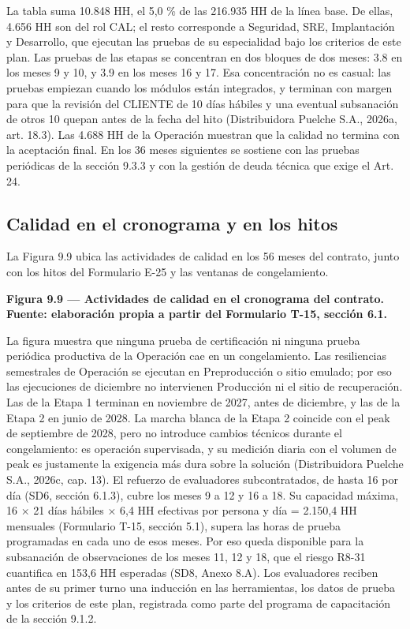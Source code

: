 La tabla suma 10.848 HH, el 5,0 \% de las 216.935 HH de la línea base. De ellas, 4.656 HH son del rol CAL; el resto corresponde a Seguridad, SRE, Implantación y Desarrollo, que ejecutan las pruebas de su especialidad bajo los criterios de este plan. Las pruebas de las etapas se concentran en dos bloques de dos meses: 3.8 en los meses 9 y 10, y 3.9 en los meses 16 y 17. Esa concentración no es casual: las pruebas empiezan cuando los módulos están integrados, y terminan con margen para que la revisión del CLIENTE de 10 días hábiles y una eventual subsanación de otros 10 quepan antes de la fecha del hito (Distribuidora Puelche S.A., 2026a, art. 18.3). Las 4.688 HH de la Operación muestran que la calidad no termina con la aceptación final. En los 36 meses siguientes se sostiene con las pruebas periódicas de la sección 9.3.3 y con la gestión de deuda técnica que exige el Art. 24.

\subsection{Calidad en el cronograma y en los hitos}

La Figura 9.9 ubica las actividades de calidad en los 56 meses del contrato, junto con los hitos del Formulario E-25 y las ventanas de congelamiento.



\textbf{Figura 9.9 — Actividades de calidad en el cronograma del contrato. Fuente: elaboración propia a partir del Formulario T-15, sección 6.1.}

La figura muestra que ninguna prueba de certificación ni ninguna prueba periódica productiva de la Operación cae en un congelamiento. Las resiliencias semestrales de Operación se ejecutan en Preproducción o sitio emulado; por eso las ejecuciones de diciembre no intervienen Producción ni el sitio de recuperación. Las de la Etapa 1 terminan en noviembre de 2027, antes de diciembre, y las de la Etapa 2 en junio de 2028. La marcha blanca de la Etapa 2 coincide con el peak de septiembre de 2028, pero no introduce cambios técnicos durante el congelamiento: es operación supervisada, y su medición diaria con el volumen de peak es justamente la exigencia más dura sobre la solución (Distribuidora Puelche S.A., 2026c, cap. 13). El refuerzo de evaluadores subcontratados, de hasta 16 por día (SD6, sección 6.1.3), cubre los meses 9 a 12 y 16 a 18. Su capacidad máxima, 16 × 21 días hábiles × 6,4 HH efectivas por persona y día = 2.150,4 HH mensuales (Formulario T-15, sección 5.1), supera las horas de prueba programadas en cada uno de esos meses. Por eso queda disponible para la subsanación de observaciones de los meses 11, 12 y 18, que el riesgo R8-31 cuantifica en 153,6 HH esperadas (SD8, Anexo 8.A). Los evaluadores reciben antes de su primer turno una inducción en las herramientas, los datos de prueba y los criterios de este plan, registrada como parte del programa de capacitación de la sección 9.1.2.

